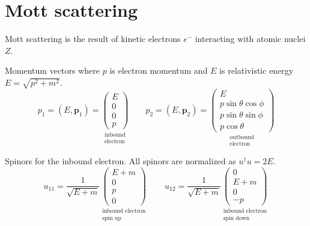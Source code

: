 

\section*{Mott scattering}

Mott scattering is the result of kinetic electrons $e^-$ interacting with atomic nuclei $Z$.

\begin{center}
\end{center}

Momentum vectors where $p$ is electron momentum and $E$ is relativistic energy $E=\sqrt{p^2+m^2}$.
\begin{equation*}
p_1=(E,\mathbf p_1)
=\underset{\substack{\text{inbound}\\ \text{electron}}}
{\begin{pmatrix}E\\0\\0\\p\end{pmatrix}}
\qquad
p_2=(E,\mathbf p_2)
=\underset{\substack{\text{outbound}\\ \text{electron}}}
{\begin{pmatrix}
E\\
p\sin\theta\cos\phi\\
p\sin\theta\sin\phi\\
p\cos\theta
\end{pmatrix}}
\end{equation*}

Spinors for the inbound electron. All spinors are normalized as $u^\dag u=2E$.
\begin{equation*}
u_{11}=\frac{1}{\sqrt{E+m}}
\underset{\substack{\text{inbound electron}\\ \text{spin up}}}
{\begin{pmatrix}E+m\\0\\p\\0\end{pmatrix}}
\qquad
u_{12}=\frac{1}{\sqrt{E+m}}
\underset{\substack{\text{inbound electron}\\ \text{spin down}}}
{\begin{pmatrix}0\\E+m\\0\\-p\end{pmatrix}}
\end{equation*}

